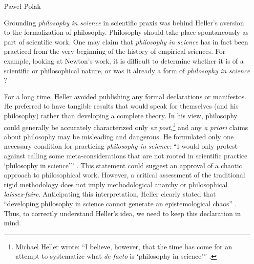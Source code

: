 \begin{artengenv}{Paweł Polak}

Grounding \textit{philosophy in science} in scientific praxis was behind Heller’s aversion to the formalization of
philosophy. Philosophy should take place spontaneously as part of scientific work. One may claim that
\textit{philosophy in science }has in fact been practiced from the very beginning of the history of empirical sciences.
For example, looking at Newton’s work, it is difficult to determine whether it is of a scientific or philosophical
nature, or was it already a form of \textit{philosophy in science}
\parencite[p.\pageref{heller-newton}]{pol_heller_how_2019}?

For a long time, Heller avoided publishing any formal declarations or manifestos. He preferred to have tangible results
that would speak for themselves (and his philosophy) rather than developing a complete theory. In his view, philosophy
could generally be accurately characterized only \textit{ex post,}\footnote{Michael Heller wrote: ``I believe, however,
that the time has come for an attempt to systematize what \textit{de facto} is ‘philosophy in science’''
\parencite[p.\pageref{heller-defacto}]{pol_heller_how_2019}.
} and any \textit{a priori} claims about philosophy may be misleading and dangerous. He formulated only one
necessary condition for practicing \textit{philosophy in science}: ``I would only protest against calling some
meta-considerations that are not rooted in scientific practice ‘philosophy in science’''
\parencite[p.\pageref{heller-not-rooted}]{pol_heller_how_2019}.
This
statement
could suggest an approval of a chaotic approach to philosophical work. However, a critical
assessment of the traditional rigid methodology does not imply methodological anarchy or philosophical
\emph{laissez}-\emph{faire}. Anticipating this interpretation, Heller clearly stated that ``developing
philosophy in science cannot generate an epistemological chaos''
\parencite[p.8]{pol_heller_introduction_1983}.
Thus, to
correctly understand Heller’s idea, we need to keep this declaration in mind.


\end{artengenv}
